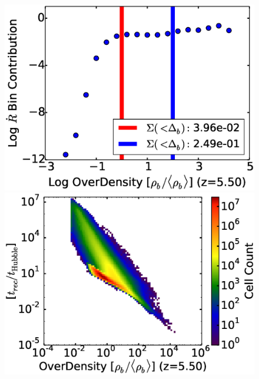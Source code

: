 \begin{figure}[!tp]
\begin{minipage}[h]{0.33\linewidth}
       \includegraphics[trim = 5mm 8mm 0mm 0mm, clip, width=1.0\textwidth]{4_2_HD20125_recomb_contrib_v_OD.eps}
     \end{minipage}
\hspace*{-4.00mm}
    \begin{minipage}[h]{0.33\linewidth}
       \centering
       \includegraphics[trim = 5mm 8mm 0mm 0mm, clip, width=1.0\textwidth]{4_3_HD20125OverDensityRecombHubbleTime.eps}
    \end{minipage}
\\ 
     \begin{minipage}[h]{0.33\linewidth}
        \centering

\end{minipage}
\end{figure}
